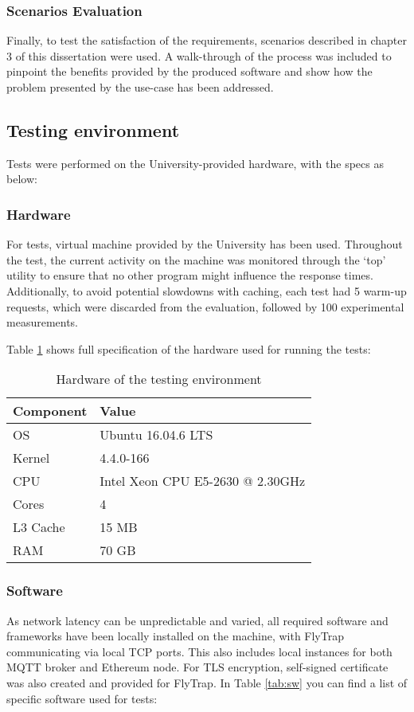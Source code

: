 \subsubsection{Scenarios Evaluation}
Finally, to test the satisfaction of the requirements, scenarios described in chapter 3 of this dissertation were used. A walk-through of the process was included to pinpoint the benefits provided by the produced software and show how the problem presented by the use-case has been addressed.

\subsection{Testing environment}
Tests were performed on the University-provided hardware, with the specs as below:
\subsubsection{Hardware}
For tests, virtual machine provided by the University has been used. Throughout the test, the current activity on the machine was monitored through the `top' utility to ensure that no other program might influence the response times. Additionally, to avoid potential slowdowns with caching, each test had 5 warm-up requests, which were discarded from the evaluation, followed by 100 experimental measurements.

Table \ref{tab:hw} shows full specification of the hardware used for running the tests:
\begin{table}[h]
\centering
\begin{tabular}{|l|l|}
\hline
\textbf{Component} & \textbf{Value}                   \\ \hline
OS                 & Ubuntu 16.04.6 LTS               \\ \hline
Kernel             & 4.4.0-166                        \\ \hline
CPU                & Intel Xeon CPU E5-2630 @ 2.30GHz \\ \hline
Cores              & 4                                \\ \hline
L3 Cache           & 15 MB                            \\ \hline
RAM                & 70 GB                            \\ \hline
\end{tabular}
\caption{Hardware of the testing environment}
\label{tab:hw}
\end{table}
\subsubsection{Software}
As network latency can be unpredictable and varied, all required software and frameworks have been locally installed on the machine, with FlyTrap communicating via local TCP ports. This also includes local instances for both MQTT broker and Ethereum node. For TLS encryption, self-signed certificate was also created and provided for FlyTrap. In Table \ref{tab:sw} you can find a list of specific software used for tests:

